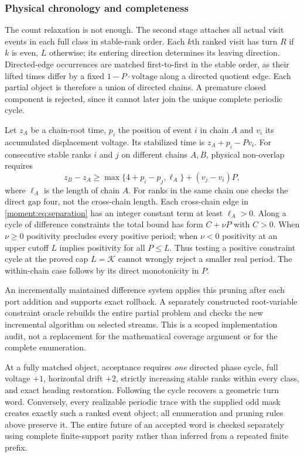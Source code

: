 \subsubsection{Physical chronology and completeness}
The count relaxation is not enough. The second stage attaches all actual
visit events in each full class in stable-rank order. Each $k$th ranked visit
has turn $R$ if $k$ is even, $L$ otherwise; its entering direction determines
its leaving direction. Directed-edge occurrences are matched first-to-first
in the stable order, as their lifted times differ by a fixed
$1-P\cdot\text{voltage}$ along a directed quotient edge. Each partial
object is therefore a union of directed chains. A premature closed component
is rejected, since it cannot later join the unique complete periodic cycle.

Let $z_A$ be a chain-root time, $p_i$ the position of event $i$ in chain
$A$ and $v_i$ its accumulated displacement voltage. Its stabilized time is
$z_A+p_i-Pv_i$. For consecutive stable ranks $i$ and $j$ on different
chains $A,B$, physical non-overlap requires
\begin{equation}\label{moment:eq:separation}
 z_B-z_A\ge \max\{4+p_i-p_j,\ell_A\}+(v_j-v_i)P,
\end{equation}
where $\ell_A$ is the length of chain $A$. For ranks in the same chain one
checks the direct gap four, not the cross-chain length. Each cross-chain
edge in \eqref{moment:eq:separation} has an integer constant term at least
$\ell_A>0$. Along a cycle of difference constraints the total bound has
form $C+\nu P$ with $C>0$. When $\nu\ge0$ positivity precludes every positive
period; when $\nu<0$ positivity at an upper cutoff $L$ implies positivity for
all $P\le L$. Thus testing a positive constraint cycle at the proved cap
$L=\mathcal K$ cannot wrongly reject a smaller real period. The within-chain
case follows by its direct monotonicity in $P$.

An incrementally maintained difference system applies this pruning after
each port addition and supports exact rollback. A separately constructed
root-variable constraint oracle rebuilds the entire partial problem and
checks the new incremental algorithm on selected streams. This is a scoped
implementation audit, not a replacement for the mathematical coverage
argument or for the complete enumeration.

At a fully matched object, acceptance requires \emph{one} directed phase
cycle, full voltage $+1$, horizontal drift $+2$, strictly increasing stable
ranks within every class, and exact heading restoration. Following the cycle
recovers a geometric turn word. Conversely, every realizable periodic trace
with the supplied odd mask creates exactly such a ranked event object; all
enumeration and pruning rules above preserve it. The entire future of an
accepted word is checked separately using complete finite-support parity
rather than inferred from a repeated finite prefix.

